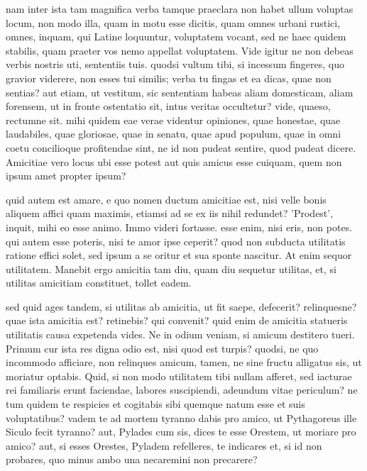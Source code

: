  nam inter ista tam magnifica verba tamque praeclara non habet ullum voluptas locum, non modo illa, quam in motu esse dicitis, quam omnes urbani rustici, omnes, inquam, qui Latine loquuntur, voluptatem vocant, sed ne haec quidem stabilis, quam praeter vos nemo appellat voluptatem. Vide igitur ne non debeas verbis nostris uti, sententiis tuis. quodsi vultum tibi, si incessum fingeres, quo gravior viderere, non esses tui similis; verba tu fingas et ea dicas, quae non sentias? aut etiam, ut vestitum, sic sententiam habeas aliam domesticam, aliam forensem, ut in fronte ostentatio sit, intus veritas occultetur? vide, quaeso, rectumne sit. mihi quidem eae verae videntur opiniones, quae honestae, quae laudabiles, quae gloriosae, quae in senatu, quae apud populum, quae in omni coetu concilioque profitendae sint, ne id non pudeat sentire, quod pudeat dicere. Amicitiae vero locus ubi esse potest aut quis amicus esse cuiquam, quem non ipsum amet propter ipsum?

 quid autem est amare, e quo nomen ductum amicitiae est, nisi velle bonis aliquem affici quam maximis, etiamsi ad se ex iis nihil redundet? 'Prodest', inquit, mihi eo esse animo. Immo videri fortasse. esse enim, nisi eris, non potes. qui autem esse poteris, nisi te amor ipse ceperit? quod non subducta utilitatis ratione effici solet, sed ipsum a se oritur et sua sponte nascitur. At enim sequor utilitatem. Manebit ergo amicitia tam diu, quam diu sequetur utilitas, et, si utilitas amicitiam constituet, tollet eadem.

 sed quid ages tandem, si utilitas ab amicitia, ut fit saepe, defecerit? relinquesne? quae ista amicitia est? retinebis? qui convenit? quid enim de amicitia statueris utilitatis causa expetenda vides. Ne in odium veniam, si amicum destitero tueri. Primum cur ista res digna odio est, nisi quod est turpis? quodsi, ne quo incommodo afficiare, non relinques amicum, tamen, ne sine fructu alligatus sis, ut moriatur optabis. Quid, si non modo utilitatem tibi nullam afferet, sed iacturae rei familiaris erunt faciendae, labores suscipiendi, adeundum vitae periculum? ne tum quidem te respicies et cogitabis sibi quemque natum esse et suis voluptatibus? vadem te ad mortem tyranno dabis pro amico, ut Pythagoreus ille Siculo fecit tyranno? aut, Pylades cum sis, dices te esse Orestem, ut moriare pro amico? aut, si esses Orestes, Pyladem refelleres, te indicares et, si id non probares, quo minus ambo una necaremini non precarere?

